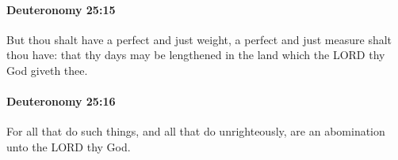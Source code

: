 		\paragraph{Deuteronomy 25:15} %
			\label{DEUTERONOMY-25-15}

			But thou shalt have a perfect and just weight, a perfect and just measure shalt thou have: that thy days may be lengthened in the land which the LORD thy God giveth thee.


		\paragraph{Deuteronomy 25:16} %
			\label{DEUTERONOMY-25-16}

			For all that do such things, and all that do unrighteously, are an abomination unto the LORD thy God.



